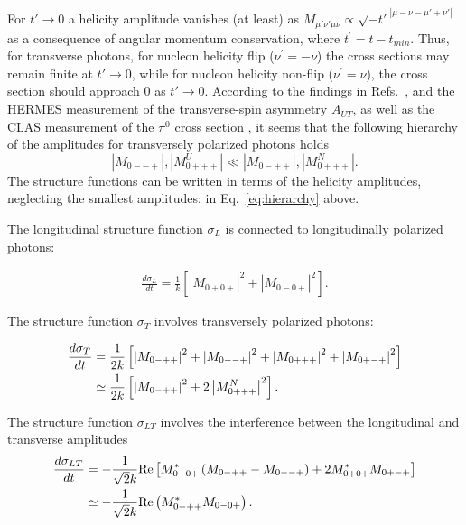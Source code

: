 \documentclass[prc,floatfix,twocolumn,superscriptaddress,letter]{revtex4}
\begin{document}
For $t'\rightarrow 0$ a helicity amplitude vanishes (at least) as 
$M_{\mu '\nu '\mu\nu} \propto \sqrt{-t'}^{|\mu-\nu-\mu '+\nu '|}$ 
as a consequence of angular momentum conservation, where $t^\prime=t-t_{min}$. 
Thus, for transverse photons, for nucleon helicity flip ($\nu^\prime = -\nu$) the cross sections may remain finite at $t'\to 0$, while for nucleon helicity non-flip ($\nu^\prime = \nu$), the cross section should approach 0 as $t'\to 0$.
According to the findings in Refs.~\cite{G-K-09},\cite{G-K-11} and the HERMES measurement of the transverse-spin asymmetry $A_{UT}$, as well as the CLAS measurement of the $\pi^0$ cross section \cite{bedlinskiy}, it seems that  the following hierarchy of the amplitudes for transversely polarized photons holds
\begin{equation}
 \label{eq:hierarchy}
|M_{0--+}|, |M^U_{0+++}| \ll |M_{0-++}|, |M^N_{0+++}|.
\end{equation}
\noindent
The structure functions can be written in terms of the helicity amplitudes,  neglecting the  smallest amplitudes: in Eq.~\ref{eq:hierarchy} above.


The  longitudinal structure function $\sigma_L$ is connected to longitudinally polarized photons:

\begin{align}
\frac{d\sigma_L}{dt} = \frac{1}{k} \left[ \left|M_{0+0+}\right|^2 + \left|M_{0-0+}\right|^2 \right].
\label{B10}
\end{align}


The structure function $\sigma_T$ involves  transversely polarized photons:
\begin{widetext}
\begin{align}
\frac{d\sigma_T}{dt} &= \frac{1}{2k} \left[ \left|M_{0-++}\right|^2 + \left|M_{0--+}\right|^2 + \left|M_{0+++}\right|^2 + \left|M_{0+-+}\right|^2 \right] \notag
\\ & \simeq \frac{1}{2k} \left[ \left|M_{0-++}\right|^2 + 2\left|M^N_{0+++}\right|^2 \right].
\label{B11}
\end{align}


The structure function  $\sigma_{LT}$ involves the interference between the longitudinal  and transverse amplitudes
\begin{align}
\frac{d\sigma_{LT}}{dt} &= -\frac{1}{\sqrt{2}k} \text{Re} \left[ M^*_{0-0+} \left( M_{0-++} - M_{0--+} \right) + 2 M^*_{0+0+} M_{0+-+} \right] \notag\\ & \simeq -\frac{1}{\sqrt{2}k} \text{Re} \left( M^*_{0-++} M_{0-0+} \right).
\label{B12}
\end{align}
\end{widetext}
\end{document}
